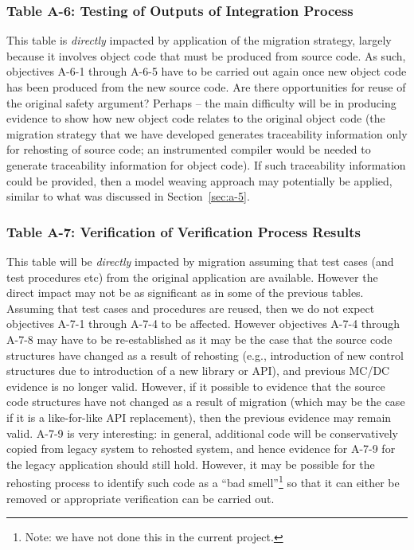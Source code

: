 \documentclass{llncs}
\begin{document}

\subsubsection{Table A-6: Testing of Outputs of Integration Process}
This table is \textit{directly} impacted by application of the migration strategy, largely because it involves object code that must be produced from source code. As such, objectives A-6-1 through A-6-5 have to be carried out again once new object code has been produced from the new source code. Are there opportunities for reuse of the original safety argument? Perhaps -- the main difficulty will be in producing evidence to show how new object code relates to the original object code (the migration strategy that we have developed generates traceability information only for rehosting of source code; an instrumented compiler would be needed to generate traceability information for object code). If such traceability information could be provided, then a model weaving approach may potentially be applied, similar to what was discussed in Section~\ref{sec:a-5}.

\subsubsection{Table A-7: Verification of Verification Process Results}
This table will be \textit{directly} impacted by migration assuming that test cases (and test procedures etc) from the original application are available. However the direct impact may not be as significant as in some of the previous tables. Assuming that test cases and procedures are reused, then we do not expect objectives A-7-1 through A-7-4 to be affected. However objectives A-7-4 through A-7-8 may have to be re-established as it may be the case that the source code structures have changed as a result of rehosting (e.g., introduction of new control structures due to introduction of a new library or API), and previous MC/DC evidence is no longer valid. However, if it possible to evidence that the source code structures have not changed as a result of migration (which may be the case if it is a like-for-like API replacement), then the previous evidence may remain valid. A-7-9 is very interesting: in general, additional code will be conservatively copied from legacy system to rehosted system, and hence evidence for A-7-9 for the legacy application should still hold. However, it may be possible for the rehosting process to identify such code as a ``bad smell''\footnote{Note: we have not done this in the current project.} so that it can either be removed or appropriate verification can be carried out.
\end{document}
